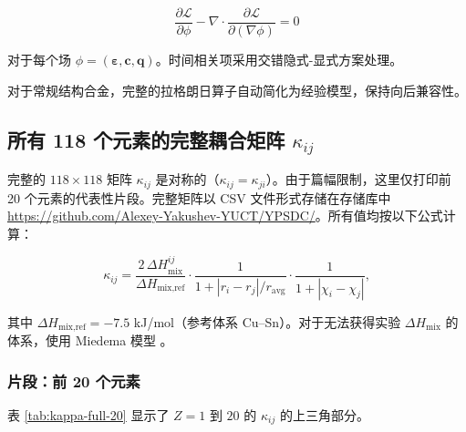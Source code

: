 \documentclass[12pt,a4paper]{article}
\begin{document}
	\[
	\frac{\partial \mathcal{L}}{\partial \phi} - \nabla \cdot \frac{\partial \mathcal{L}}{\partial (\nabla\phi)} = 0
	\]
	
	对于每个场 \(\phi = (\boldsymbol{\varepsilon}, \mathbf{c}, \mathbf{q})\)。时间相关项采用交错隐式-显式方案处理。
	
	对于常规结构合金，完整的拉格朗日算子自动简化为经验模型，保持向后兼容性。
	
	
	\subsection{所有 118 个元素的完整耦合矩阵 \(\kappa_{ij}\)}
	\label{subsec:full-kappa}
	
	完整的 \(118\times118\) 矩阵 \(\kappa_{ij}\) 是对称的（\(\kappa_{ij}=\kappa_{ji}\)）。由于篇幅限制，这里仅打印前 20 个元素的代表性片段。完整矩阵以 CSV 文件形式存储在存储库中 \url{https://github.com/Alexey-Yakushev-YUCT/YPSDC/}。所有值均按以下公式计算：
	
	\[
	\kappa_{ij} = \frac{2\,\Delta H_{\text{mix}}^{ij}}{\Delta H_{\text{mix,ref}}} \cdot
	\frac{1}{1 + |r_i - r_j|/r_{\text{avg}}} \cdot
	\frac{1}{1 + |\chi_i - \chi_j|},
	\]
	
	其中 \(\Delta H_{\text{mix,ref}} = -7.5\) kJ/mol（参考体系 Cu–Sn）。对于无法获得实验 \(\Delta H_{\text{mix}}\) 的体系，使用 Miedema 模型 \cite{Miedema1980}。
	
	\subsubsection*{片段：前 20 个元素}
	表 \ref{tab:kappa-full-20} 显示了 \(Z=1\) 到 \(20\) 的 \(\kappa_{ij}\) 的上三角部分。
	
\end{document}

